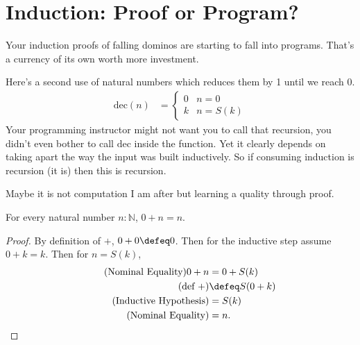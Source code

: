 

\section{Induction: Proof or Program?}
Your induction proofs of falling dominos are starting to fall into programs.
That's a currency of its own worth more investment.

Here's a second use of natural numbers which reduces them by 1 until we reach $0$.
\begin{align*}
    \text{dec}(n) & =\begin{cases}
        0 & n=0\\
        k & n=S(k)
    \end{cases}
\end{align*}
Your programming instructor might not want you to call that recursion, you didn't 
even bother to call $\text{dec}$ inside the function.  Yet it clearly 
depends on taking apart the way the input was built inductively.  So if 
consuming induction is recursion (it is) then this is recursion.

Maybe it is not computation I am after but learning a quality through proof.

\begin{proposition}
    For every natural number $n:\mathbb{N}$, $0+n=n$.
\end{proposition}
\begin{proof}
    By definition of $+$, $0+0\defeq 0$.
    Then for the inductive step assume 
    $0+k=k$.  Then for $n=S(k)$, 
    \begin{align*}
        \tag{Nominal Equality}
        0+n & = 0+S(k)\\
        \tag{def $+$}
        & \defeq S(0+k)\\
        \tag{Inductive Hypothesis}
        & =S(k)\\
        \tag{Nominal Equality}
        & =n.
\end{align*}
\end{proof}

